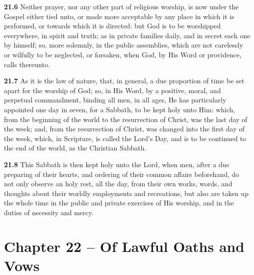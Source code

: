 \par\textbf{21.6} Neither prayer, nor any other part of religious worship, is now under the Gospel either tied unto, or made more acceptable by any place in which it is performed, or towards which it is directed: but God is to be worshipped everywhere, in spirit and truth; as in private families daily, and in secret each one by himself; so, more solemnly, in the public assemblies, which are not carelessly or wilfully to be neglected, or forsaken, when God, by His Word or providence, calls thereunto.   

\par\textbf{21.7} As it is the law of nature, that, in general, a due proportion of time be set apart for the worship of God; so, in His Word, by a positive, moral, and perpetual commandment, binding all men, in all ages, He has particularly appointed one day in seven, for a Sabbath, to be kept holy unto Him: which, from the beginning of the world to the resurrection of Christ, was the last day of the week; and, from the resurrection of Christ, was changed into the first day of the week, which, in Scripture, is called the Lord's Day, and is to be continued to the end of the world, as the Christian Sabbath.   

\par\textbf{21.8} This Sabbath is then kept holy unto the Lord, when men, after a due preparing of their hearts, and ordering of their common affairs beforehand, do not only observe an holy rest, all the day, from their own works, words, and thoughts about their worldly employments and recreations, but also are taken up the whole time in the public and private exercises of His worship, and in the duties of necessity and mercy.  

\section{Chapter 22 -- Of Lawful Oaths and Vows}

